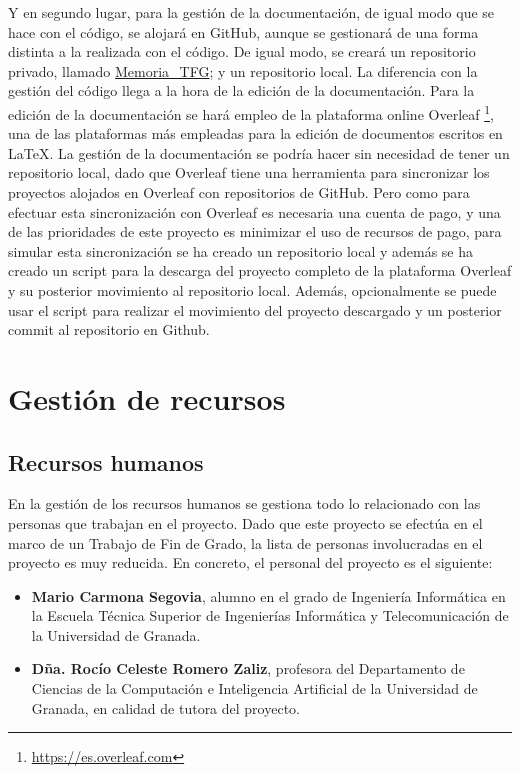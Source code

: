 Y en segundo lugar, para la gestión de la documentación, de igual modo que se hace con el código, se alojará en GitHub, aunque se gestionará de una forma distinta a la realizada con el código. De igual modo, se creará un repositorio privado, llamado \href{https://github.com/Mario-Carmona/Memoria_TFG}{Memoria\_TFG}; y un repositorio local. La diferencia con la gestión del código llega a la hora de la edición de la documentación. Para la edición de la documentación se hará empleo de la plataforma online Overleaf \footnote{\url{https://es.overleaf.com}}, una de las plataformas más empleadas para la edición de documentos escritos en LaTeX. La gestión de la documentación se podría hacer sin necesidad de tener un repositorio local, dado que Overleaf tiene una herramienta para sincronizar los proyectos alojados en Overleaf con repositorios de GitHub. Pero como para efectuar esta sincronización con Overleaf es necesaria una cuenta de pago, y una de las prioridades de este proyecto es minimizar el uso de recursos de pago, para simular esta sincronización se ha creado un repositorio local y además se ha creado un script para la descarga del proyecto completo de la plataforma Overleaf y su posterior movimiento al repositorio local. Además, opcionalmente se puede usar el script para realizar el movimiento del proyecto descargado y un posterior commit al repositorio en Github.

\section{Gestión de recursos} \label{sec:gest_recursos}

\subsection{Recursos humanos}

En la gestión de los recursos humanos se gestiona todo lo relacionado con las personas que trabajan en el proyecto. Dado que este proyecto se efectúa en el marco de un Trabajo de Fin de Grado, la lista de personas involucradas en el proyecto es muy reducida. En concreto, el personal del proyecto es el siguiente:

\begin{itemize}
\item \textbf{Mario Carmona Segovia}, alumno en el grado de Ingeniería Informática en la Escuela Técnica Superior de Ingenierías Informática y Telecomunicación de la Universidad de Granada.
\item \textbf{Dña. Rocío Celeste Romero Zaliz}, profesora del Departamento de Ciencias de la Computación e Inteligencia Artificial de la Universidad de Granada, en calidad de tutora del proyecto.
\end{itemize}

